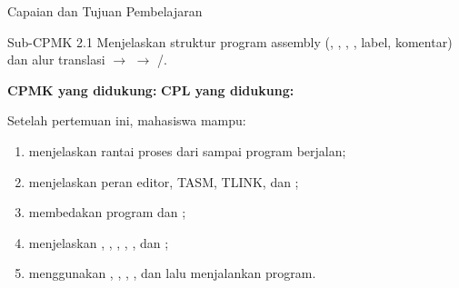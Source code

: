 \documentclass[aspectratio=169,11pt]{beamer}
\begin{document}

\begin{frame}{Capaian dan Tujuan Pembelajaran}
\begin{block}{Sub-CPMK 2.1}
\small Menjelaskan struktur program assembly (,
, , , label, komentar) dan alur
translasi  $\rightarrow$  $\rightarrow$
/.
\end{block}

\vspace{0.1em}
{\small\textbf{CPMK yang didukung:} \quad\textbullet\quad
\textbf{CPL yang didukung:} \par}

\vspace{0.15em}
\begin{exampleblock}{Setelah pertemuan ini, mahasiswa mampu:}
\footnotesize
\begin{enumerate}
    \item menjelaskan rantai proses dari  sampai program
          berjalan;
    \item menjelaskan peran editor, TASM, TLINK, dan ;
    \item membedakan program  dan ;
    \item menjelaskan , , ,
          , , dan ;
    \item menggunakan , , , , dan
           lalu menjalankan program.
\end{enumerate}
\end{exampleblock}
\end{frame}
\end{document}
